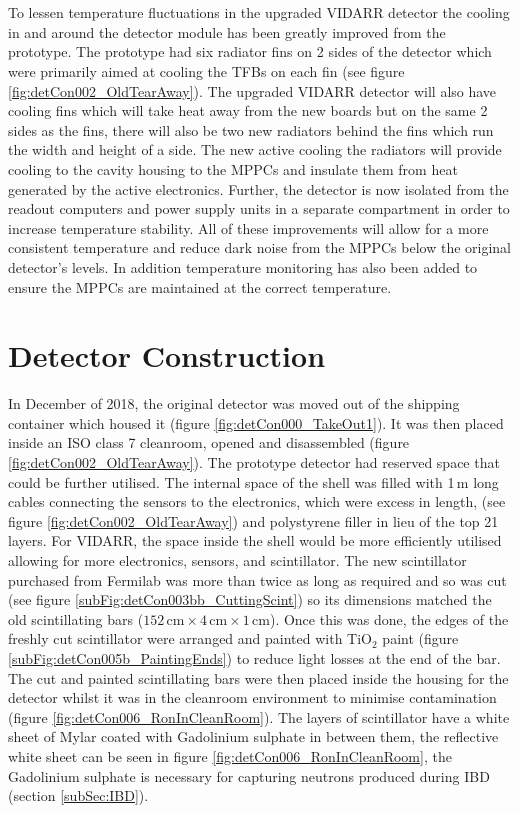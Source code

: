 \\\\To lessen temperature fluctuations in the upgraded VIDARR detector the cooling in and around the detector module has been greatly improved from the prototype. The prototype had six radiator fins on 2 sides of the detector which were primarily aimed at cooling the TFBs on each fin (see figure \ref{fig:detCon002_OldTearAway}). The upgraded VIDARR detector will also have cooling fins which will take heat away from the new boards but on the same 2 sides as the fins, there will also be two new radiators behind the fins which run the width and height of a side. The new active cooling the radiators will provide cooling to the cavity housing to the MPPCs and insulate them from heat generated by the active electronics. Further, the detector is now isolated from the readout computers and power supply units in a separate compartment in order to increase temperature stability. All of these improvements will allow for a more consistent temperature and reduce dark noise from the MPPCs below the original detector's levels. In addition temperature monitoring has also been added to ensure the MPPCs are maintained at the correct temperature.

\section{Detector Construction}\label{sec:DetectorConstruction}
In December of 2018, the original detector was moved out of the shipping container which housed it (figure \ref{fig:detCon000_TakeOut1}). It was then placed inside an ISO class 7 cleanroom, opened and disassembled (figure \ref{fig:detCon002_OldTearAway}). The prototype detector had reserved space that could be further utilised. The internal space of the shell was filled with 1\,m long cables connecting the sensors to the electronics, which were excess in length, (see figure \ref{fig:detCon002_OldTearAway}) and polystyrene filler in lieu of the top 21 layers. For VIDARR, the space inside the shell would be more efficiently utilised allowing for more electronics, sensors, and scintillator. The new scintillator purchased from Fermilab was more than twice as long as required and so was cut (see figure \ref{subFig:detCon003bb_CuttingScint}) so its dimensions matched the old scintillating bars ($152\,\textrm{cm} \times 4\,\textrm{cm} \times 1\,\textrm{cm}$). Once this was done, the edges of the freshly cut scintillator were arranged and painted with TiO$_2$ paint (figure \ref{subFig:detCon005b_PaintingEnds}) to reduce light losses at the end of the bar. The cut and painted scintillating bars were then placed inside the housing for the detector whilst it was in the cleanroom environment to minimise contamination (figure \ref{fig:detCon006_RonInCleanRoom}). The layers of scintillator have a white sheet of Mylar coated with Gadolinium sulphate in between them, the reflective white sheet can be seen in figure \ref{fig:detCon006_RonInCleanRoom}, the Gadolinium sulphate is necessary for capturing neutrons produced during IBD (section \ref{subSec:IBD}). 


